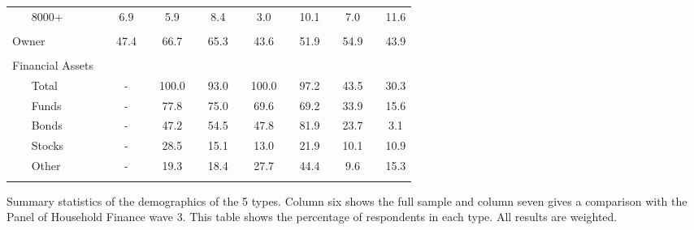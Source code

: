\begin{table}[ht!]
{\begin{threeparttable}
\begin{tabular}{ll|cccccccccccccc}
	& 8000+ &  & 6.9 &  & 5.9 &  & 8.4 &  & 3.0 &  & 10.1 &  & 7.0 &  & 11.6 \\
	&  &  &  &  &  &  &  &  &  &  &  &  &  &  &  \\
	\multicolumn{2}{l|}{Owner} &  & 47.4 &  & 66.7 &  & 65.3 &  & 43.6 &  & 51.9 &  & 54.9 &  & 43.9 \\
	&  &  &  &  &  &  &  &  &  &  &  &  &  &  &  \\
	\multicolumn{2}{l|}{Financial   Assets} &  &  &  &  &  &  &  &  &  &  &  &  &  &  \\
	& Total &  & - &  & 100.0 &  & 93.0 &  & 100.0 &  & 97.2 &  & 43.5 &  & 30.3 \\
	& Funds &  & - &  & 77.8 &  & 75.0 &  & 69.6 &  & 69.2 &  & 33.9 &  & 15.6 \\
	& Bonds &  & - &  & 47.2 &  & 54.5 &  & 47.8 &  & 81.9 &  & 23.7 &  & 3.1 \\
	& Stocks &  & - &  & 28.5 &  & 15.1 &  & 13.0 &  & 21.9 &  & 10.1 &  & 10.9 \\
	& Other &  & - &  & 19.3 &  & 18.4 &  & 27.7 &  & 44.4 &  & 9.6 &  & 15.3 \\
	&  &  &  &  &  &  &  &  &  &  &  &  &  &  &    \\ \hline \hline 
\end{tabular}
		\begin{tablenotes}\footnotesize
				\item[] Summary statistics of the demographics of the 5 types. Column six shows the full sample and column seven gives a comparison with the Panel of Household Finance wave 3. This table shows the percentage of respondents in each type. All results are weighted.
			\end{tablenotes}
		\end{threeparttable}
	}
\end{table}